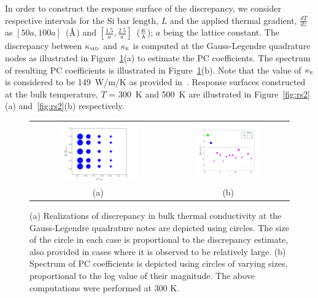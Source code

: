 In order to construct the response surface of the discrepancy, we consider respective intervals for the Si bar length,
$L$ and the applied thermal gradient, $\frac{dT}{dz}$ as $[50a,100a]$~($\mbox{\normalfont\AA}$) and
 $[\frac{1.5}{a},\frac{2.5}{a}]$~($\frac{\mbox{\tiny{K}}}{\tiny{\mbox{\normalfont\AA}}}$); $a$ being the lattice constant. The 
 discrepancy between $\kappa_{\mbox{\tiny{MD}}}$ and $\kappa_{\mbox{\tiny{E}}}$ is computed at the
 Gauss-Legendre quadrature nodes as illustrated in Figure~\ref{fig:rs1}(a) to estimate the PC coefficients. The spectrum of 
 resulting PC coefficients is illustrated in Figure~\ref{fig:rs1}(b). 
Note that the value of $\kappa_{\mbox{\tiny{E}}}$ is considered to be 149~W/m/K as provided 
 in~\cite{Shanks:1963}. Response surfaces constructed at the bulk temperature, $T$ = 300~K and 500~K are 
 illustrated
 in Figure~\ref{fig:rs2}(a) and~\ref{fig:rs2}(b) respectively. 

\begin{figure}[htbp]
\begin{center}
\begin{tabular}{cc}
  \hspace{-12mm}
  \includegraphics[width=0.60\textwidth]{./Figures/realz_quad300K}
  &
  \hspace{-9mm}
  \includegraphics[width=0.56\textwidth]{./Figures/PCspectrum_300}
  \\ (a) & (b)
  \end{tabular}
\caption{(a) Realizations of discrepancy in bulk thermal conductivity at the Gauss-Legendre quadrature notes are
depicted using circles. The size of the circle in each case is proportional to the discrepancy estimate, also provided
 in cases where it is observed to be relatively large. (b) Spectrum of PC coefficients is depicted using circles of
 varying sizes, proportional to the log value of their magnitude. The above computations were performed at 300 K.}
\label{fig:rs1}
\end{center}
\end{figure}

